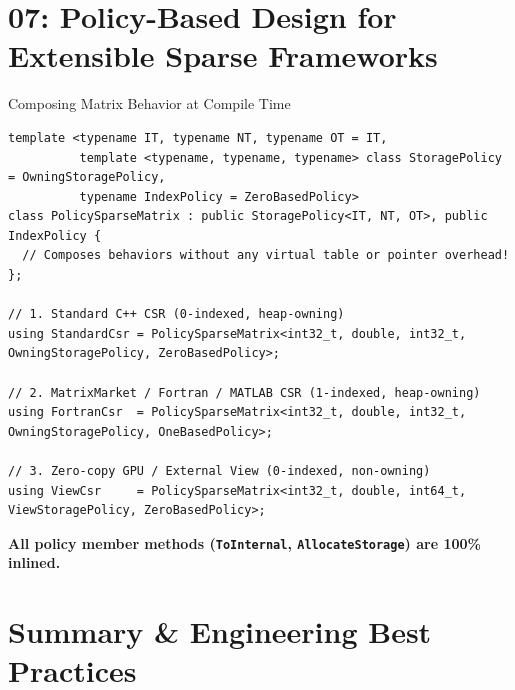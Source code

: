 \documentclass[aspectratio=169,10pt]{beamer}
\newcommand{\metricbox}[1]{%
  \par\vspace{0.25em}%
  \centering%
  \colorbox{AccentWash}{\parbox{0.94\linewidth}{\centering\strut\textcolor{Ink}{\bfseries #1}}}%
  \par\vspace{0.10em}%
}
\newcommand{\sectionfoot}[1]{\gdef\insertsectionhead{#1}}
\newcommand{\subhead}[1]{%
  \medskip{\large\bfseries\textcolor{Accent}{#1}\par}%
  \vspace{-0.18cm}{\color{Accent}\rule{0.88\linewidth}{1.2pt}\par}\smallskip}
\begin{document}
\section{07: Policy-Based Design for Extensible Sparse Frameworks}
\sectionfoot{07: Policy-Based Design}

\begin{frame}[fragile]{Composing Matrix Behavior at Compile Time}
  \subhead{Orthogonal Policies via Templates}
  \begin{lstlisting}[style=lecturecode]
template <typename IT, typename NT, typename OT = IT,
          template <typename, typename, typename> class StoragePolicy = OwningStoragePolicy,
          typename IndexPolicy = ZeroBasedPolicy>
class PolicySparseMatrix : public StoragePolicy<IT, NT, OT>, public IndexPolicy {
  // Composes behaviors without any virtual table or pointer overhead!
};

// 1. Standard C++ CSR (0-indexed, heap-owning)
using StandardCsr = PolicySparseMatrix<int32_t, double, int32_t, OwningStoragePolicy, ZeroBasedPolicy>;

// 2. MatrixMarket / Fortran / MATLAB CSR (1-indexed, heap-owning)
using FortranCsr  = PolicySparseMatrix<int32_t, double, int32_t, OwningStoragePolicy, OneBasedPolicy>;

// 3. Zero-copy GPU / External View (0-indexed, non-owning)
using ViewCsr     = PolicySparseMatrix<int32_t, double, int64_t, ViewStoragePolicy, ZeroBasedPolicy>;
  \end{lstlisting}
  \metricbox{All policy member methods (\texttt{ToInternal}, \texttt{AllocateStorage}) are \textbf{100\% inlined}.}
\end{frame}

\section{Summary \& Engineering Best Practices}
\sectionfoot{Summary}
\end{document}

